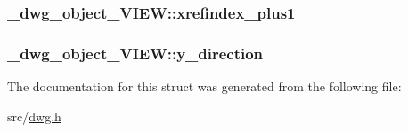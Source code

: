\hypertarget{struct__dwg__object__VIEW_a5f8c7efab8121c734516ca8b410fe20c}{
\subsubsection[{xrefindex\-\_\-plus1}]{ {\bf \-\_\-dwg\-\_\-object\-\_\-\-V\-I\-E\-W\-::xrefindex\-\_\-plus1}}}\label{struct__dwg__object__VIEW_a5f8c7efab8121c734516ca8b410fe20c}
\hypertarget{struct__dwg__object__VIEW_a44f75fb880c27d42b9f73481648a41f9}{
\subsubsection[{y\-\_\-direction}]{ {\bf \-\_\-dwg\-\_\-object\-\_\-\-V\-I\-E\-W\-::y\-\_\-direction}}}\label{struct__dwg__object__VIEW_a44f75fb880c27d42b9f73481648a41f9}


\-The documentation for this struct was generated from the following file\-:\begin{DoxyCompactItemize}
\item 
src/\hyperlink{dwg_8h}{dwg.\-h}\end{DoxyCompactItemize}
